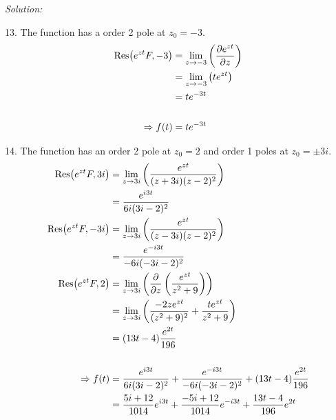 \documentclass[11pt]{homework}
\begin{document}
\emph{Solution:}
\newline

13. The function has a order 2 pole at $z_0=-3$.
\begin{align*}
\Res( e^{zt} F, -3) 
  &= \lim_{z\to -3} \left( \pdv{e^{zt}}{z} \right) \\
  &= \lim_{z\to -3} \left( te^{zt} \right) \\
  &= te^{-3t} \\
\\
\Rightarrow
f(t) &= te^{-3t} 
\end{align*}

14. The function has an order 2 pole at $z_0=2$ and order 1 poles at $z_0=\pm3i$.
\begin{align*}
\Res( e^{zt}F, 3i) 
  &= \lim_{z\to 3i} \left( \frac{e^{zt}}{(z+3i)(z-2)^2} \right) \\
  &= \frac{e^{i3t}}{6i(3i-2)^2} \\
\Res( e^{zt}F, -3i) 
  &= \lim_{z\to 3i} \left( \frac{e^{zt}}{(z-3i)(z-2)^2} \right) \\
  &= \frac{e^{-i3t}}{-6i(-3i-2)^2} \\
\Res( e^{zt}F, 2) 
  &= \lim_{z\to 3i} \left( \frac{\partial}{\partial z}\left( \frac{e^{zt}}{z^2+9} \right) \right)  \\ 
  &= \lim_{z\to 3i} \left( \frac{-2ze^{zt}}{(z^2+9)^2} + \frac{te^{zt}}{z^2+9}  \right)  \\ 
  &= (13t-4) \frac{e^{2t}}{196} \\
\\
\Rightarrow
f(t) 
  &= \frac{e^{i3t}}{6i(3i-2)^2} + \frac{e^{-i3t}}{-6i(-3i-2)^2} + (13t-4) \frac{e^{2t}}{196} \\
  &= \frac{5i+12}{1014} e^{i3t} + \frac{-5i+12}{1014} e^{-i3t} +\frac{13t-4}{196} e^{2t}
\end{align*}
\end{document}
